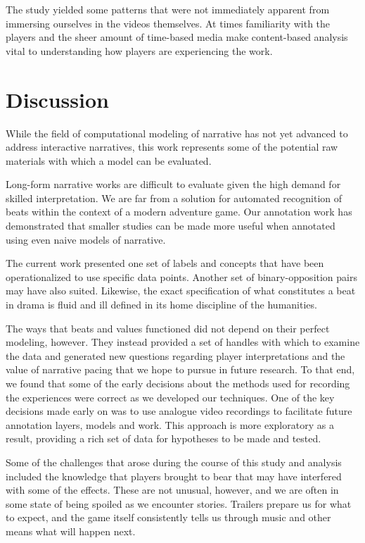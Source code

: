 The study yielded some patterns that were not immediately apparent
from immersing ourselves in the videos themselves. At times
familiarity with the players and the sheer amount of time-based media
make content-based analysis vital to understanding how players are
experiencing the work.

\section{Discussion}
\label{sec:orgfe21c1b}
While the field of computational modeling of narrative has
not yet advanced to address interactive narratives, this work
represents some of the potential raw materials with which a model can
be evaluated.

Long-form narrative works are difficult to evaluate given the high
demand for skilled interpretation. We are far from a solution for
automated recognition of beats within the context of a modern
adventure game. Our annotation work has demonstrated that smaller
studies can be made more useful when annotated using even naive models
of narrative. 

The current work presented one set of labels and concepts that have
been operationalized to use specific data points. Another set of
binary-opposition pairs may have also suited. Likewise, the exact
specification of what constitutes a beat in drama is fluid and ill
defined in its home discipline of the humanities.

The ways that beats and values functioned did not depend on their
perfect modeling, however. They instead provided a set of handles with
which to examine the data and generated new questions regarding player
interpretations and the value of narrative pacing that we hope to
pursue in future research. To that end, we found that some of the
early decisions about the methods used for recording the experiences
were correct as we developed our techniques. One of the key decisions
made early on was to use analogue video recordings to facilitate
future annotation layers, models and work. This approach is more
exploratory as a result, providing a rich set of data for hypotheses
to be made and tested.

Some of the challenges that arose during the course of this study and
analysis included the knowledge that players brought to bear that may
have interfered with some of the effects. These are not unusual,
however, and we are often in some state of being spoiled as we
encounter stories. Trailers prepare us for what to expect, and the
game itself consistently tells us through music and other means what
will happen next.


